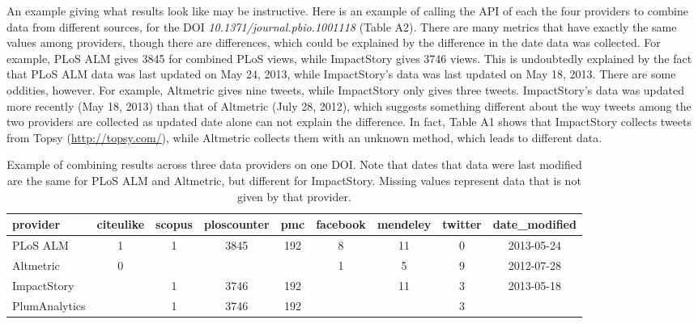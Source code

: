 \documentclass[letterpaper,superscriptaddress,showkeys,longbibliography]{revtex4-1}\usepackage{graphicx, color}
\begin{document}
An example giving what results look like may be instructive. Here is an example of calling the API of each the four providers to combine data from different sources, for the DOI \emph{10.1371/journal.pbio.1001118} \cite{arslan2011} (Table A2). There are many metrics that have exactly the same values among providers, though there are differences, which could be explained by the difference in the date data was collected. For example, PLoS ALM gives 3845 for combined PLoS views, while ImpactStory gives 3746 views. This is undoubtedly explained by the fact that PLoS ALM data was last updated on May 24, 2013, while ImpactStory's data was last updated on May 18, 2013. There are some oddities, however. For example, Altmetric gives nine tweets, while ImpactStory only gives three tweets. ImpactStory's data was updated more recently (May 18, 2013) than that of Altmetric (July 28, 2012), which suggests something different about the way tweets among the two providers are collected as updated date alone can not explain the difference. In fact, Table A1 shows that ImpactStory collects tweets from Topsy (\url{http://topsy.com/}), while Altmetric collects them with an unknown method, which leads to different data.

\begin{table}[ht]
\centering
\caption{Example of combining results across three data providers on one DOI. Note that dates that data were last modified are the same for PLoS ALM and Altmetric, but different for ImpactStory. Missing values represent data that is not given by that provider.} 
\begin{tabular}{l|cccccccc}
  \hline
provider & citeulike & scopus & ploscounter & pmc & facebook & mendeley & twitter & date\_modified \\ 
  \hline
PLoS ALM & 1 & 1 & 3845 & 192 & 8 & 11 & 0 & 2013-05-24 \\ 
  Altmetric & 0 &  &  &  & 1 & 5 & 9 & 2012-07-28 \\ 
  ImpactStory &  & 1 & 3746 & 192 &  & 11 & 3 & 2013-05-18 \\ 
  PlumAnalytics &  & 1 & 3746 & 192 &  &  & 3 &  \\ 
   \hline
\end{tabular}
\end{table}



\end{document}
